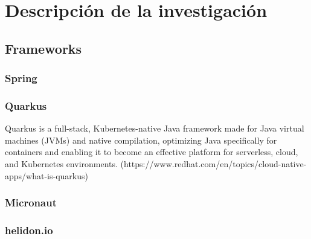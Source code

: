 \chapter{Descripción de la investigación}


\section{Frameworks}

\subsection{Spring}

\subsection{Quarkus}
Quarkus is a full-stack, Kubernetes-native Java framework made for Java virtual machines (JVMs) and native compilation, optimizing Java specifically for containers and enabling it to become an effective platform for serverless, cloud, and Kubernetes environments.
(https://www.redhat.com/en/topics/cloud-native-apps/what-is-quarkus)

\subsection{Micronaut}

\subsection{helidon.io}

